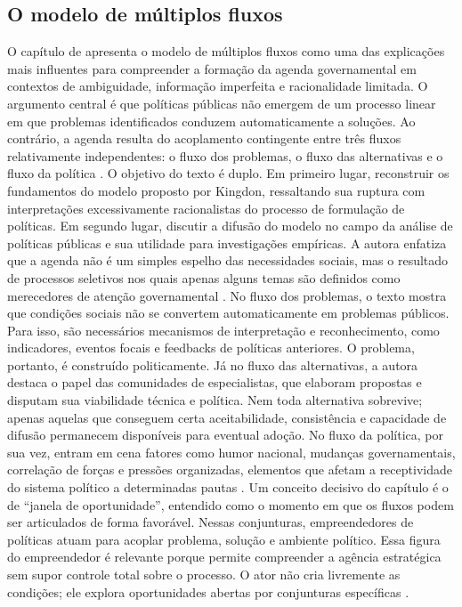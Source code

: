 \documentclass[12pt,a4paper]{article}
\begin{document}
\subsection{O modelo de múltiplos fluxos}
\label{sec:org0cd0b10}
O capítulo de \textcite{capella2022multiplos} apresenta o modelo de múltiplos fluxos como uma das explicações mais influentes para compreender a formação da agenda governamental em contextos de ambiguidade, informação imperfeita e racionalidade limitada. O argumento central é que políticas públicas não emergem de um processo linear em que problemas identificados conduzem automaticamente a soluções. Ao contrário, a agenda resulta do acoplamento contingente entre três fluxos relativamente independentes: o fluxo dos problemas, o fluxo das alternativas e o fluxo da política \autocites{capella2022multiplos}{kingdon2003agendas}.
O objetivo do texto é duplo. Em primeiro lugar, reconstruir os fundamentos do modelo proposto por Kingdon, ressaltando sua ruptura com interpretações excessivamente racionalistas do processo de formulação de políticas. Em segundo lugar, discutir a difusão do modelo no campo da análise de políticas públicas e sua utilidade para investigações empíricas. A autora enfatiza que a agenda não é um simples espelho das necessidades sociais, mas o resultado de processos seletivos nos quais apenas alguns temas são definidos como merecedores de atenção governamental \autocite{capella2022multiplos}.
No fluxo dos problemas, o texto mostra que condições sociais não se convertem automaticamente em problemas públicos. Para isso, são necessários mecanismos de interpretação e reconhecimento, como indicadores, eventos focais e feedbacks de políticas anteriores. O problema, portanto, é construído politicamente. Já no fluxo das alternativas, a autora destaca o papel das comunidades de especialistas, que elaboram propostas e disputam sua viabilidade técnica e política. Nem toda alternativa sobrevive; apenas aquelas que conseguem certa aceitabilidade, consistência e capacidade de difusão permanecem disponíveis para eventual adoção. No fluxo da política, por sua vez, entram em cena fatores como humor nacional, mudanças governamentais, correlação de forças e pressões organizadas, elementos que afetam a receptividade do sistema político a determinadas pautas \autocite{capella2022multiplos}.
Um conceito decisivo do capítulo é o de “janela de oportunidade”, entendido como o momento em que os fluxos podem ser articulados de forma favorável. Nessas conjunturas, empreendedores de políticas atuam para acoplar problema, solução e ambiente político. Essa figura do empreendedor é relevante porque permite compreender a agência estratégica sem supor controle total sobre o processo. O ator não cria livremente as condições; ele explora oportunidades abertas por conjunturas específicas \autocites{capella2022multiplos}{kingdon2003agendas}.
\end{document}
